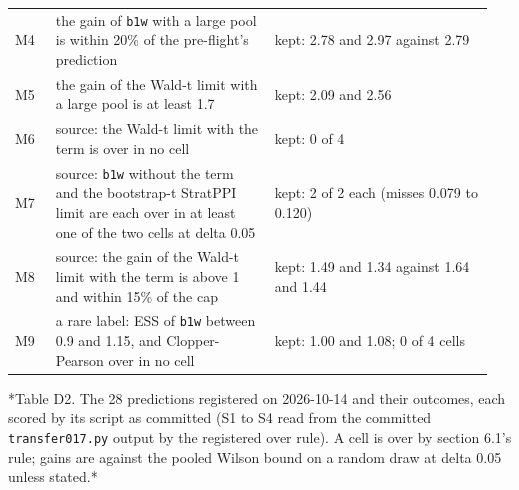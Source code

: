 \documentclass[11pt]{article}
\begin{document}
\begin{longtable}{@{}>{\raggedright\arraybackslash}p{0.087\linewidth}>{\raggedright\arraybackslash}p{0.430\linewidth}>{\raggedright\arraybackslash}p{0.430\linewidth}@{}}
\hspace{0pt}M4 & \hspace{0pt}the gain of \texttt{b1w} with a large pool is within 20\% of the pre-flight's prediction & \hspace{0pt}kept: 2.78 and 2.97 against 2.79 \\
\hspace{0pt}M5 & \hspace{0pt}the gain of the Wald-t limit with a large pool is at least 1.7 & \hspace{0pt}kept: 2.09 and 2.56 \\
\hspace{0pt}M6 & \hspace{0pt}source: the Wald-t limit with the term is over in no cell & \hspace{0pt}kept: 0 of 4 \\
\hspace{0pt}M7 & \hspace{0pt}source: \texttt{b1w} without the term and the bootstrap-t StratPPI limit are each over in at least one of the two cells at delta 0.05 & \hspace{0pt}kept: 2 of 2 each (misses 0.079 to 0.120) \\
\hspace{0pt}M8 & \hspace{0pt}source: the gain of the Wald-t limit with the term is above 1 and within 15\% of the cap & \hspace{0pt}kept: 1.49 and 1.34 against 1.64 and 1.44 \\
\hspace{0pt}M9 & \hspace{0pt}a rare label: ESS of \texttt{b1w} between 0.9 and 1.15, and Clopper-Pearson over in no cell & \hspace{0pt}kept: 1.00 and 1.08; 0 of 4 cells \\
\end{longtable}
\endgroup

*Table D2. The 28 predictions registered on 2026-10-14 and their outcomes, each scored by its script as committed (S1 to S4 read from the committed \texttt{transfer017.py} output by the registered over rule). A cell is over by section 6.1's rule; gains are against the pooled Wilson bound on a random draw at delta 0.05 unless stated.*
\end{document}

